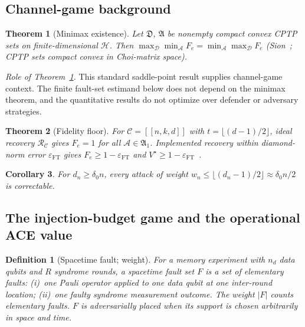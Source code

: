 \documentclass[pdflatex,sn-mathphys-num]{sn-jnl}
\theoremstyle{thmstyleone}
\newtheorem{theorem}{Theorem}
\newtheorem{corollary}[theorem]{Corollary}
\theoremstyle{thmstyletwo}
\theoremstyle{thmstylethree}
\newtheorem{definition}{Definition}
\begin{document}
\subsection{Channel-game background}

\begin{theorem}[Minimax existence]\label{thm:minimax}
Let $\mathfrak{D}$, $\mathfrak{A}$ be nonempty compact convex CPTP sets on finite-dimensional $\mathcal{H}$. Then $\max_{\mathcal{D}}\min_{\mathcal{A}} F_e = \min_{\mathcal{A}}\max_{\mathcal{D}} F_e$ (Sion~\cite{Sion1958}; CPTP sets compact convex in Choi-matrix space).
\end{theorem}

\noindent\emph{Role of Theorem~\ref{thm:minimax}.} This standard saddle-point result supplies channel-game context. The finite fault-set estimand below does not depend on the minimax theorem, and the quantitative results do not optimize over defender or adversary strategies.

\begin{theorem}[Fidelity floor]\label{thm:fidelity-floor}
For $\mathcal{C}=[[n,k,d]]$ with $t=\lfloor(d-1)/2\rfloor$, ideal recovery $\mathcal{R}_\mathcal{C}$ gives $F_e=1$ for all $\mathcal{A}\in\mathfrak{A}_1$. Implemented recovery within diamond-norm error $\varepsilon_\mathrm{FT}$ gives $F_e\ge1-\varepsilon_\mathrm{FT}$ and $V^\star\ge1-\varepsilon_\mathrm{FT}$~\cite{KnillLaflamme1997,FuchsVandeGraaf1999}.
\end{theorem}

\begin{corollary}
For $d_n\ge\delta_0 n$, every attack of weight $w_n\le\lfloor(d_n-1)/2\rfloor\approx\delta_0 n/2$ is correctable.
\end{corollary}

\subsection{The injection-budget game and the operational ACE value}

\begin{definition}[Spacetime fault; weight]\label{def:fault}
For a memory experiment with $n_d$ data qubits and $R$ syndrome rounds, a \emph{spacetime fault set} $F$ is a set of elementary faults: (i)~one Pauli operator applied to one data qubit at one inter-round location; (ii)~one faulty syndrome measurement outcome. The weight $|F|$ counts elementary faults. $F$ is \emph{adversarially placed} when its support is chosen arbitrarily in space and time.
\end{definition}
\end{document}
